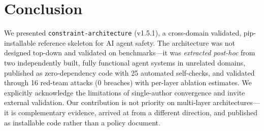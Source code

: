 \documentclass[letterpaper]{article}
\begin{document}
\section{Conclusion}

We presented \texttt{constraint-architecture} (v1.5.1), a cross-domain
validated, pip-installable reference skeleton for AI agent safety.  The
architecture was not designed top-down and validated on benchmarks---it was
\textit{extracted post-hoc} from two independently built, fully functional
agent systems in unrelated domains, published as zero-dependency code with 25
automated self-checks, and validated through 16 red-team attacks (0 breaches)
with per-layer ablation estimates.  We explicitly acknowledge the limitations
of single-author convergence and invite external validation.  Our contribution
is not priority on multi-layer architectures---it is complementary evidence,
arrived at from a different direction, and published as installable code rather
than a policy document.

\end{document}
